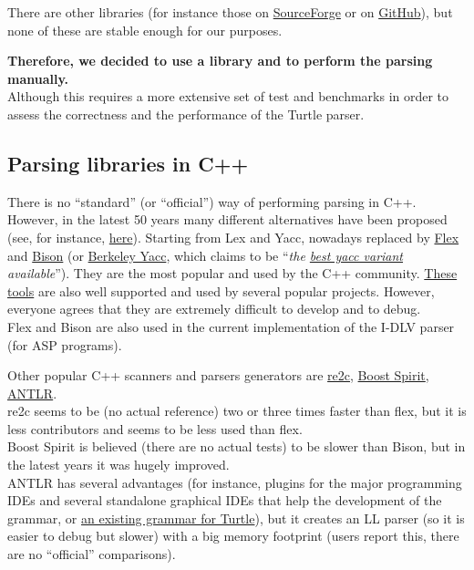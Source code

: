 \documentclass[oneside]{book}
\begin{document}
There are other libraries (for instance those on \href{https://sourceforge.net/directory/language:cpp/os:windows/?q=turtle}{SourceForge} or on \href{https://github.com/topics/turtle?l=c\%2B\%2B}{GitHub}), but none of these are stable enough for our purposes.

\textbf{Therefore, we decided to use a library and to perform the parsing manually.}\\
Although this requires a more extensive set of test and benchmarks in order to assess the correctness and the performance of the Turtle parser.

\subsection{Parsing libraries in C++}
There is no ``standard'' (or ``official'') way of performing parsing in C++.\\
However, in the latest 50 years many different alternatives have been proposed (see, for instance, \href{https://en.wikipedia.org/wiki/Comparison_of_parser_generators}{here}).
Starting from Lex and Yacc, nowadays replaced by \href{https://github.com/westes/flex}{Flex} and \href{https://www.gnu.org/software/bison}{Bison} (or \href{https://invisible-island.net/byacc}{Berkeley Yacc}, which claims to be ``\textit{the \href{https://web.archive.org/web/20130327184430/http://foldoc.org/byacc}{best yacc variant} available}''). They are the most popular and used by the C++ community. \href{http://dinosaur.compilertools.net}{These tools} are also well supported and used by several popular projects. However, everyone agrees that they are extremely difficult to develop and to debug.\\
Flex and Bison are also used in the current implementation of the I-DLV parser (for ASP programs).

Other popular C++ scanners and parsers generators are \href{http://re2c.org}{re2c}, \href{https://www.boost.org/doc/libs/1_68_0/libs/spirit}{Boost Spirit}, \href{http://www.antlr.org}{ANTLR}.\\
re2c seems to be (no actual reference) two or three times faster than flex, but it is less contributors and seems to be less used than flex.\\
Boost Spirit is believed (there are no actual tests) to be slower than Bison, but in the latest years it was hugely improved.\\
ANTLR has several advantages (for instance, plugins for the major programming IDEs and several standalone graphical IDEs that help the development of the grammar, or \href{https://github.com/antlr/grammars-v4/blob/master/turtle/TURTLE.g4}{an existing grammar for Turtle}), but it creates an LL parser (so it is easier to debug but slower) with a big memory footprint (users report this, there are no ``official'' comparisons).
\end{document}

